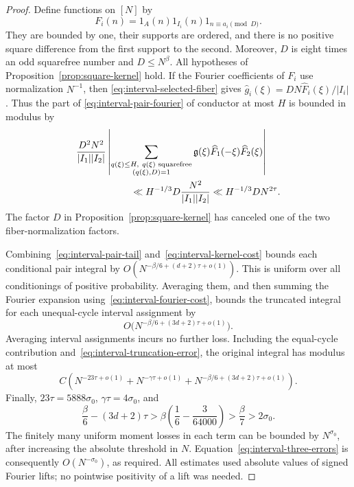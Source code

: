 \begin{proof}
Define functions on \([N]\) by
\[
 F_i(n)=1_A(n)1_{I_i}(n)1_{n\equiv a_i\pmod D}.
\]
They are bounded by one, their supports are ordered, and there is no
positive square difference from the first support to the second.
Moreover, \(D\) is eight times an odd squarefree number and
\(D\le N^\beta\). All hypotheses of
Proposition~\ref{prop:square-kernel} hold. If the Fourier coefficients
of \(F_i\) use normalization \(N^{-1}\), then
\eqref{eq:interval-selected-fiber} gives
\(\widehat g_i(\xi)=DN\widehat F_i(\xi)/|I_i|\). Thus the part of
\eqref{eq:interval-pair-fourier} of conductor at most \(H\) is bounded
in modulus by
\begin{align}
 &\frac{D^2N^2}{|I_1||I_2|}
 \left|\sum_{\substack{q(\xi)\le H,\ q(\xi)\text{ squarefree}\\
                       (q(\xi),D)=1}}
      \mathfrak g(\xi)\widehat F_1(-\xi)\widehat F_2(\xi)\right|
 \notag\\
 &\hspace{2cm}\ll H^{-1/3}D\frac{N^2}{|I_1||I_2|}
 \ll H^{-1/3}D N^{2\tau}.
 \label{eq:interval-kernel-cost}
\end{align}
The factor \(D\) in Proposition~\ref{prop:square-kernel} has canceled
one of the two fiber-normalization factors.

Combining~\eqref{eq:interval-pair-tail}
and~\eqref{eq:interval-kernel-cost} bounds each conditional pair integral
by \(O(N^{-\beta/6+(d+2)\tau+o(1)})\). This is uniform over all
conditionings of positive probability. Averaging them, and then summing
the Fourier expansion using~\eqref{eq:interval-fourier-cost}, bounds the
truncated integral for each unequal-cycle interval assignment by
\[
 O\bigl(N^{-\beta/6+(3d+2)\tau+o(1)}\bigr).
\]
Averaging interval assignments incurs no further loss. Including the
equal-cycle contribution and~\eqref{eq:interval-truncation-error}, the
original integral has modulus at most
\begin{equation}
 C\left(N^{-23\tau+o(1)}+N^{-\gamma\tau+o(1)}
       +N^{-\beta/6+(3d+2)\tau+o(1)}\right).
 \label{eq:interval-three-errors}
\end{equation}
Finally, \(23\tau=5888\sigma_0\), \(\gamma\tau=4\sigma_0\), and
\[
 \frac\beta6-(3d+2)\tau
 >\beta\left(\frac16-\frac3{64000}\right)
 >\frac\beta7>2\sigma_0.
\]
The finitely many uniform moment losses in each term can be bounded by
\(N^{\sigma_0}\), after increasing the absolute threshold in \(N\).
Equation~\eqref{eq:interval-three-errors} is consequently
\(O(N^{-\sigma_0})\), as required. All estimates used absolute values
of signed Fourier lifts; no pointwise positivity of a lift was needed.
\end{proof}
